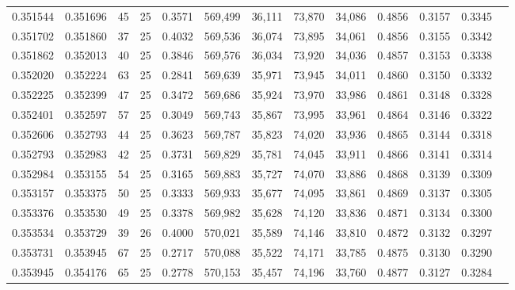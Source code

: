 \begin{tabular}{rrrrrrrrrrrrr}
0.351544 & 0.351696 &    45 &  25 &                                     0.3571 & 569,499 &  36,111 &  73,870 &  34,086 & 0.4856 & 0.3157 & 0.3345 \\
0.351702 & 0.351860 &    37 &  25 &                                     0.4032 & 569,536 &  36,074 &  73,895 &  34,061 & 0.4856 & 0.3155 & 0.3342 \\
0.351862 & 0.352013 &    40 &  25 &                                     0.3846 & 569,576 &  36,034 &  73,920 &  34,036 & 0.4857 & 0.3153 & 0.3338 \\
0.352020 & 0.352224 &    63 &  25 &                                     0.2841 & 569,639 &  35,971 &  73,945 &  34,011 & 0.4860 & 0.3150 & 0.3332 \\
0.352225 & 0.352399 &    47 &  25 &                                     0.3472 & 569,686 &  35,924 &  73,970 &  33,986 & 0.4861 & 0.3148 & 0.3328 \\
0.352401 & 0.352597 &    57 &  25 &                                     0.3049 & 569,743 &  35,867 &  73,995 &  33,961 & 0.4864 & 0.3146 & 0.3322 \\
0.352606 & 0.352793 &    44 &  25 &                                     0.3623 & 569,787 &  35,823 &  74,020 &  33,936 & 0.4865 & 0.3144 & 0.3318 \\
0.352793 & 0.352983 &    42 &  25 &                                     0.3731 & 569,829 &  35,781 &  74,045 &  33,911 & 0.4866 & 0.3141 & 0.3314 \\
0.352984 & 0.353155 &    54 &  25 &                                     0.3165 & 569,883 &  35,727 &  74,070 &  33,886 & 0.4868 & 0.3139 & 0.3309 \\
0.353157 & 0.353375 &    50 &  25 &                                     0.3333 & 569,933 &  35,677 &  74,095 &  33,861 & 0.4869 & 0.3137 & 0.3305 \\
0.353376 & 0.353530 &    49 &  25 &                                     0.3378 & 569,982 &  35,628 &  74,120 &  33,836 & 0.4871 & 0.3134 & 0.3300 \\
0.353534 & 0.353729 &    39 &  26 &                                     0.4000 & 570,021 &  35,589 &  74,146 &  33,810 & 0.4872 & 0.3132 & 0.3297 \\
0.353731 & 0.353945 &    67 &  25 &                                     0.2717 & 570,088 &  35,522 &  74,171 &  33,785 & 0.4875 & 0.3130 & 0.3290 \\
0.353945 & 0.354176 &    65 &  25 &                                     0.2778 & 570,153 &  35,457 &  74,196 &  33,760 & 0.4877 & 0.3127 & 0.3284 \\

\end{tabular}
